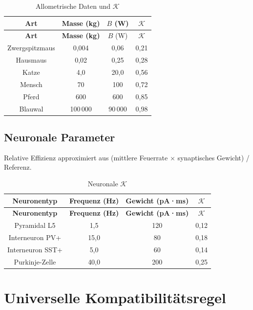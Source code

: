 \documentclass[12pt,a4paper]{article}
\newcommand{\REL}{\mathcal{K}}          %
\begin{document}
	\begin{longtable}{|c|c|c|c|}
		\caption{Allometrische Daten und \(\REL\)}\label{tab:allometry}\\
		\hline
		\textbf{Art} & \textbf{Masse (kg)} & \(B\) (W) & \(\REL\) \\
		\hline
		\endfirsthead
		\hline
		\textbf{Art} & \textbf{Masse (kg)} & \(B\) (W) & \(\REL\) \\
		\hline
		\endhead
		\hline
		Zwergspitzmaus & 0,004 & 0,06 & 0,21 \\
		Hausmaus & 0,02 & 0,25 & 0,28 \\
		Katze & 4,0 & 20,0 & 0,56 \\
		Mensch & 70 & 100 & 0,72 \\
		Pferd & 600 & 600 & 0,85 \\
		Blauwal & 100\,000 & 90\,000 & 0,98 \\
		\hline
	\end{longtable}
	
	\subsection{Neuronale Parameter}
	\label{sec:neural}
	Relative Effizienz approximiert aus (mittlere Feuerrate \(\times\) synaptisches Gewicht) / Referenz.
	
	\begin{longtable}{|c|c|c|c|}
		\caption{Neuronale \(\REL\)}\label{tab:neural}\\
		\hline
		\textbf{Neuronentyp} & \textbf{Frequenz (Hz)} & \textbf{Gewicht (pA·ms)} & \(\REL\) \\
		\hline
		\endfirsthead
		\hline
		\textbf{Neuronentyp} & \textbf{Frequenz (Hz)} & \textbf{Gewicht (pA·ms)} & \(\REL\) \\
		\hline
		\endhead
		\hline
		Pyramidal L5 & 1,5 & 120 & 0,12 \\
		Interneuron PV+ & 15,0 & 80 & 0,18 \\
		Interneuron SST+ & 5,0 & 60 & 0,14 \\
		Purkinje-Zelle & 40,0 & 200 & 0,25 \\
		\hline
	\end{longtable}
	
	\section{Universelle Kompatibilitätsregel}
	\label{sec:compatibility}
	
\end{document}
